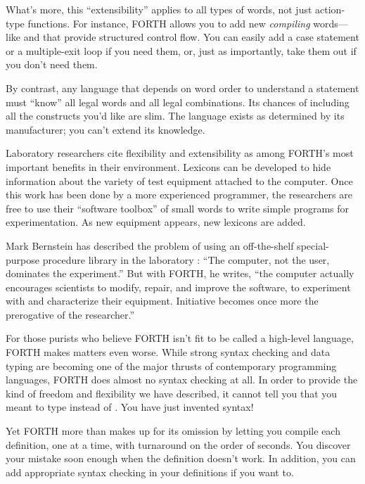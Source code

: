 What's more, this ``extensibility'' applies to all types of words, not
just action-type functions. For instance, FORTH allows you to add new
\emph{compiling} words---like  and  that provide
structured control flow. You can easily add a case statement or a
multiple-exit loop if you need them, or, just as importantly, take
them out if you don't need them.

By contrast, any language that depends on word order to understand a
statement must ``know'' all legal words and all legal combinations.
Its chances of including all the constructs you'd like are slim. The
language exists as determined by its manufacturer; you can't extend
its knowledge.

Laboratory researchers cite flexibility and extensibility as among
FORTH's most important benefits in their environment. Lexicons can be
developed to hide information about the variety of test equipment
attached to the computer. Once this work has been done by a more
experienced programmer, the researchers are free to use their
``software toolbox'' of small words to write simple programs for
experimentation. As new equipment appears, new lexicons are added.

Mark Bernstein 
has described the problem of using an off-the-shelf special-purpose
procedure library in the laboratory \cite{bern83}: ``The computer, not
the user, dominates the experiment.'' But with FORTH, he writes, ``the
computer actually encourages scientists to modify, repair, and improve
the software, to experiment with and characterize their equipment.
Initiative becomes once more the prerogative of the researcher.''


For those purists who believe FORTH isn't fit to be called a
high-level language, FORTH makes matters even worse. While strong
syntax checking and data typing are becoming one of the major thrusts
of contemporary programming languages, FORTH does almost no syntax
checking at all.  In order to provide the kind of freedom and
flexibility we have described, it cannot tell you that you meant to
type  instead of . You have just
invented syntax!

Yet FORTH more than makes up for its omission by letting you compile
each definition, one at a time, with turnaround on the order of
seconds.  You discover your mistake soon enough when the definition
doesn't work. In addition, you can add appropriate syntax checking in
your definitions if you want to.

